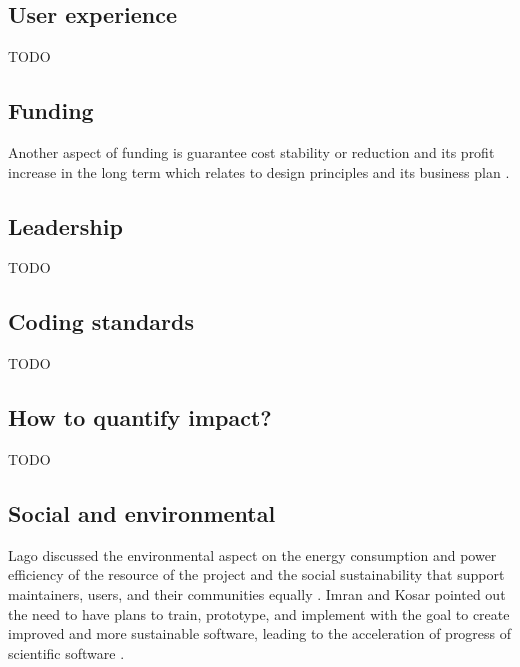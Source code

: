 \documentclass{article}
\begin{document}
\subsection{User experience}
TODO


\subsection{Funding}
Another aspect of funding is guarantee cost stability or reduction and its profit increase in the long term which relates to design principles and its business plan \cite{imran2019software}.






\subsection{Leadership}
TODO

\subsection{Coding standards}
TODO


\subsection{How to quantify impact?}
TODO


\subsection{Social and environmental}
Lago discussed the environmental aspect on the energy consumption and power efficiency of the resource of the project and the social sustainability that support maintainers, users, and their communities equally
\cite{lago2019-Software-Sustainability}. 
Imran and Kosar pointed out the need to have plans to train, prototype, and implement with the goal to create improved and more sustainable software, leading to the acceleration of progress of scientific software \cite{imran2019software}.
\end{document}
